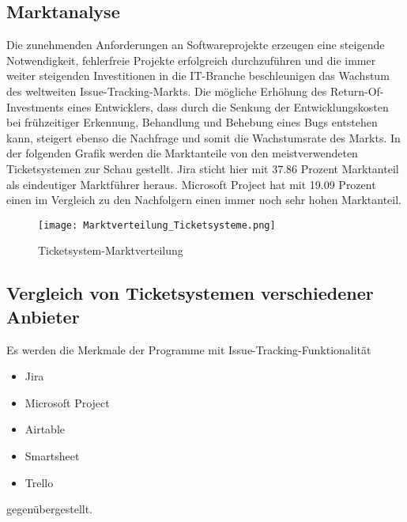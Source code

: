 \subsection{Marktanalyse}  
Die zunehmenden Anforderungen an Softwareprojekte erzeugen eine steigende Notwendigkeit, fehlerfreie Projekte erfolgreich durchzuführen und die immer weiter steigenden Investitionen in die IT-Branche beschleunigen das Wachstum des weltweiten Issue-Tracking-Markts.
Die mögliche Erhöhung des Return-Of-Investments eines Entwicklers, dass durch die Senkung der Entwicklungskosten bei frühzeitiger Erkennung, Behandlung und Behebung eines Bugs entstehen kann, steigert ebenso die Nachfrage und somit die Wachstumsrate des Markts.
In der folgenden Grafik werden die Marktanteile von den meistverwendeten Ticketsystemen zur Schau gestellt.
Jira sticht hier mit 37.86 Prozent Marktanteil als eindeutiger Marktführer heraus. Microsoft Project hat mit 19.09 Prozent einen im Vergleich zu den Nachfolgern einen immer noch sehr hohen Marktanteil.
\begin{figure}[H]
 	\centering
	\texttt{[image: Marktverteilung\_Ticketsysteme.png]}
	\caption{Ticketsystem-Marktverteilung}
\end{figure}   
\subsection{Vergleich von Ticketsystemen verschiedener Anbieter}
Es werden die Merkmale der Programme mit Issue-Tracking-Funktionalität
\begin{itemize}
	\item Jira
	\item Microsoft Project
	\item Airtable
	\item Smartsheet
	\item Trello
\end{itemize}
gegenübergestellt.   
